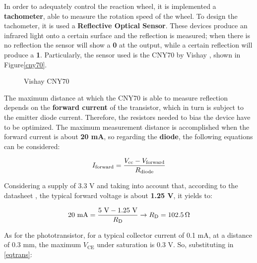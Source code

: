 In order to adequately control the reaction wheel, it is implemented a \textbf{tachometer}, able to measure the rotation speed of the wheel. To design the tachometer, it is used a \textbf{Reflective Optical Sensor}. These devices produce an infrared light onto a certain surface and the reflection is measured; when there is no reflection the sensor will show a \textbf{0} at the output, while a certain reflection will produce a \textbf{1}. Particularly, the sensor used is the CNY70 by Vishay \cite{cny}, shown in Figure\autoref{cny70}.


\begin{figure}[H]
			\centering
			\quad
			\caption{Vishay CNY70 \cite{cny}} %
\end{figure}

The maximum distance at which the CNY70 is able to measure reflection depends on the \textbf{forward current} of the transistor, which in turn is subject to the emitter diode current. Therefore, the resistors needed to bias the device have to be optimized. The maximum measurement distance is accomplished when the forward current is about \textbf{20 mA}, so regarding the \textbf{diode}, the following equations can be considered:


\begin{equation}
\centering
I_{\text{forward}}=\frac{V_{\text{cc}}-V_{\text{forward}}}{R_{\text{diode}}}
\end{equation} %


Considering a supply of 3.3 V and taking into account that, according to the datasheet \cite{cny}, the typical forward voltage is about\textbf{ 1.25 V}, it yields to:


\begin{equation} 
\centering
20 \text{ mA}=\frac{5 \text{ V}- 1.25 \text{ V}}{R_{\text{D}}} \rightarrow R_{\text{D}} = \SI{102.5}{\ohm}
\end{equation} %

As for the phototransistor, for a typical collector current of 0.1 mA, at a distance of 0.3 mm, the maximum $V_{\text{CE}}$ under saturation is 0.3 V. So, substituting in \autoref{eqtrans}:



